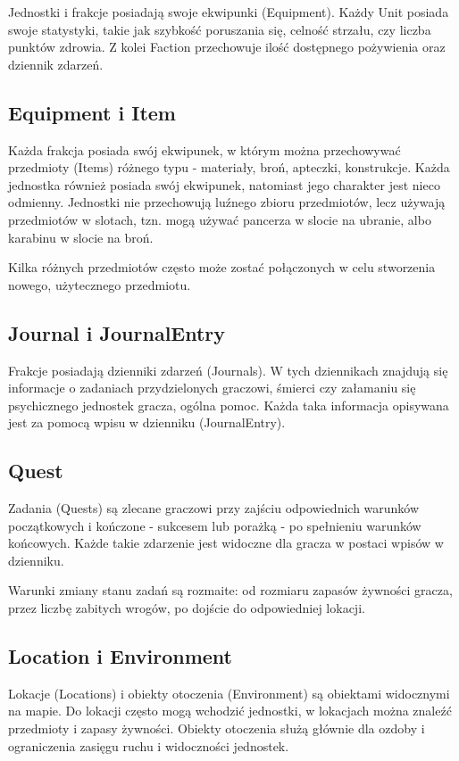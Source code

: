 \documentclass[licencjacka]{pracamgr}
\begin{document}
      Jednostki i frakcje posiadają swoje ekwipunki (Equipment). Każdy Unit posiada swoje statystyki, takie jak
      szybkość poruszania się, celność strzału, czy liczba punktów zdrowia. Z kolei Faction przechowuje ilość
      dostępnego pożywienia oraz dziennik zdarzeń.

    \subsection{Equipment i Item}
      Każda frakcja posiada swój ekwipunek, w którym można przechowywać przedmioty (Items) różnego typu - materiały,
      broń, apteczki, konstrukcje. Każda jednostka również posiada swój ekwipunek, natomiast jego charakter jest nieco
      odmienny. Jednostki nie przechowują luźnego zbioru przedmiotów, lecz używają przedmiotów w slotach, tzn. mogą
      używać pancerza w slocie na ubranie, albo karabinu w slocie na broń.

      Kilka różnych przedmiotów często może zostać połączonych w celu stworzenia nowego, użytecznego przedmiotu.

    \subsection{Journal i JournalEntry}
      Frakcje posiadają dzienniki zdarzeń (Journals). W tych dziennikach znajdują się informacje o zadaniach
      przydzielonych graczowi, śmierci czy załamaniu się psychicznego jednostek gracza, ogólna pomoc. Każda taka
      informacja opisywana jest za pomocą wpisu w dzienniku (JournalEntry).

    \subsection{Quest}
      Zadania (Quests) są zlecane graczowi przy zajściu odpowiednich warunków początkowych i kończone - sukcesem lub
      porażką - po spełnieniu warunków końcowych. Każde takie zdarzenie jest widoczne dla gracza w postaci wpisów w
      dzienniku.

      Warunki zmiany stanu zadań są rozmaite: od rozmiaru zapasów żywności gracza, przez liczbę zabitych wrogów, po
      dojście do odpowiedniej lokacji.

    \subsection{Location i Environment}
      Lokacje (Locations) i obiekty otoczenia (Environment) są obiektami widocznymi na mapie. Do lokacji często mogą
      wchodzić jednostki, w lokacjach można znaleźć przedmioty i zapasy żywności. Obiekty otoczenia służą głównie dla
      ozdoby i ograniczenia zasięgu ruchu i widoczności jednostek.
\end{document}
